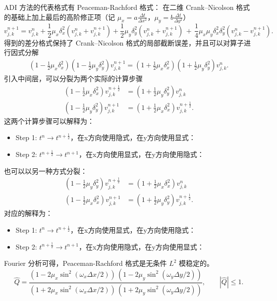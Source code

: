 ADI 方法的代表格式有 Peaceman-Rachford 格式：
在二维 Crank–Nicolson 格式的基础上加上最后的高阶修正项（记 $\mu_x =  a \frac{\Delta t}{\Delta x^2}$，$\mu_y =  b \frac{\Delta t}{\Delta y^2}$）
\[
    v_{j,k}^{n+1} = v_{j,k}^n
    + \frac12 \mu_x \delta_x^2(v_{j,k}^n + v_{j,k}^{n+1})
    + \frac12 \mu_y \delta_y^2(v_{j,k}^n + v_{j,k}^{n+1})
    \,+\, \frac14 \mu_x \mu_y \delta_x^2 \delta_y^2(v_{j,k}^n - v_{j,k}^{n+1}).
\]
得到的差分格式保持了 Crank–Nicolson 格式的局部截断误差，并且可以对算子进行因式分解
\begin{align*}
    \left(1-\frac12 \mu_x \delta_x^2 \right) \left(1-\frac12 \mu_y \delta_y^2 \right) v_{j,k}^{n+1}
    =\left(1+\frac12 \mu_x \delta_x^2\right) \left(1+\frac12 \mu_y \delta_y^2\right) v_{j,k}^{n}.
\end{align*}
引入中间层，可以分裂为两个实际的计算步骤
\begin{align*}
    \left(1-\frac12  \mu_x \delta_x^2 \right) v_{j,k}^{n+\frac12} & =\left(1+\frac12 \mu_y \delta_y^2\right) v_{j,k}^{n}         \\
    \left(1-\frac12  \mu_y \delta_y^2 \right) v_{j,k}^{n+1}       & =\left(1+\frac12 \mu_x \delta_x^2\right) v_{j,k}^{n+\frac12}.
\end{align*}
这两个计算步骤可以解释为：
\begin{itemize}
    \item Step 1: $t^n \to t^{n+\frac12}$，在x方向使用隐式，在y方向使用显式：
    \item Step 2: $t^{n+\frac12} \to t^{n+1}$，在x方向使用显式，在y方向使用隐式：
\end{itemize}
也可以以另一种方式分裂：
\begin{align*}
    \left(1-\frac12 \mu_y \delta_y^2 \right) v_{j,k}^{n+\frac12} & =\left(1+\frac12 \mu_x \delta_x^2\right) v_{j,k}^{n}         \\
    \left(1-\frac12 \mu_x \delta_x^2 \right) v_{j,k}^{n+1}       & =\left(1+\frac12 \mu_y \delta_y^2\right) v_{j,k}^{n+\frac12}.
\end{align*}
对应的解释为：
\begin{itemize}
    \item Step 1: $t^n \to t^{n+\frac12}$，在x方向使用显式，在y方向使用隐式：
    \item Step 2: $t^{n+\frac12} \to t^{n+1}$，在x方向使用隐式，在y方向使用显式：
\end{itemize}
Fourier 分析可得，Peaceman-Rachford 格式是无条件 $L^2$ 模稳定的。
\[
    \widehat{Q} =
    \frac{(1-2\mu_x \sin^2(\omega_x \Delta x/2))\,(1-2\mu_y \sin^2(\omega_y \Delta y/2))}{(1+2\mu_x \sin^2(\omega_x \Delta x/2))\,(1+2\mu_y \sin^2(\omega_y \Delta y/2))},\qquad
    |\widehat{Q}| \le 1.
\]

